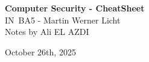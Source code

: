 \documentclass[8pt]{article}
\begin{document}
\begin{titlepage}
    \centering
    \vspace*{1cm}
    {\Huge \textbf{Computer Security - CheatSheet}} \\
    \vspace{20px}
    {\LARGE IN~BA5 - Martin Werner Licht} \\
    \vspace*{1cm}
    {\Large Notes by Ali EL AZDI} \\
    \vfill

    \begin{justify}

    \end{justify}
    \vspace*{100px}

    {\large October 26th, 2025}
    \vspace*{20px}
\end{titlepage}
\end{document}
